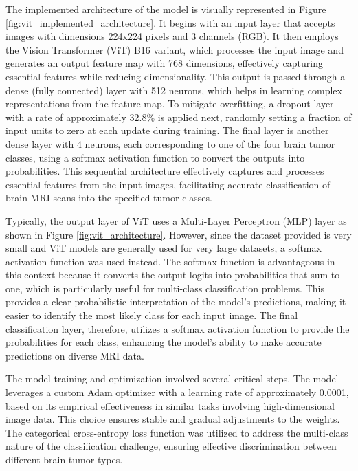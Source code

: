 The implemented architecture of the model is visually represented in Figure \ref{fig:vit_implemented_architecture}. It begins with an input layer that accepts images with dimensions 224x224 pixels and 3 channels (RGB). It then employs the Vision Transformer (ViT) B16 variant, which processes the input image and generates an output feature map with 768 dimensions, effectively capturing essential features while reducing dimensionality. This output is passed through a dense (fully connected) layer with 512 neurons, which helps in learning complex representations from the feature map. To mitigate overfitting, a dropout layer with a rate of approximately 32.8\% is applied next, randomly setting a fraction of input units to zero at each update during training. The final layer is another dense layer with 4 neurons, each corresponding to one of the four brain tumor classes, using a softmax activation function to convert the outputs into probabilities. This sequential architecture effectively captures and processes essential features from the input images, facilitating accurate classification of brain MRI scans into the specified tumor classes.

Typically, the output layer of ViT uses a Multi-Layer Perceptron (MLP) layer as shown in Figure \ref{fig:vit_architecture}. However, since the dataset provided is very small and ViT models are generally used for very large datasets, a softmax activation function was used instead. The softmax function is advantageous in this context because it converts the output logits into probabilities that sum to one, which is particularly useful for multi-class classification problems. This provides a clear probabilistic interpretation of the model's predictions, making it easier to identify the most likely class for each input image. The final classification layer, therefore, utilizes a softmax activation function to provide the probabilities for each class, enhancing the model's ability to make accurate predictions on diverse MRI data.

The model training and optimization involved several critical steps. The model leverages a custom Adam optimizer with a learning rate of approximately 0.0001, based on its empirical effectiveness in similar tasks involving high-dimensional image data. This choice ensures stable and gradual adjustments to the weights. The categorical cross-entropy loss function was utilized to address the multi-class nature of the classification challenge, ensuring effective discrimination between different brain tumor types. 

